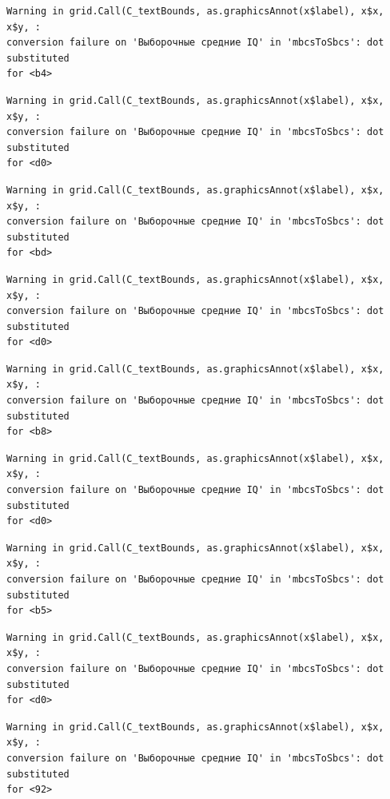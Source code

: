 \documentclass[
  letterpaper,
  DIV=11,
  numbers=noendperiod]{scrreprt}
\theoremstyle{definition}
\theoremstyle{remark}
\begin{document}
\begin{verbatim}
Warning in grid.Call(C_textBounds, as.graphicsAnnot(x$label), x$x, x$y, :
conversion failure on 'Выборочные средние IQ' in 'mbcsToSbcs': dot substituted
for <b4>
\end{verbatim}

\begin{verbatim}
Warning in grid.Call(C_textBounds, as.graphicsAnnot(x$label), x$x, x$y, :
conversion failure on 'Выборочные средние IQ' in 'mbcsToSbcs': dot substituted
for <d0>
\end{verbatim}

\begin{verbatim}
Warning in grid.Call(C_textBounds, as.graphicsAnnot(x$label), x$x, x$y, :
conversion failure on 'Выборочные средние IQ' in 'mbcsToSbcs': dot substituted
for <bd>
\end{verbatim}

\begin{verbatim}
Warning in grid.Call(C_textBounds, as.graphicsAnnot(x$label), x$x, x$y, :
conversion failure on 'Выборочные средние IQ' in 'mbcsToSbcs': dot substituted
for <d0>
\end{verbatim}

\begin{verbatim}
Warning in grid.Call(C_textBounds, as.graphicsAnnot(x$label), x$x, x$y, :
conversion failure on 'Выборочные средние IQ' in 'mbcsToSbcs': dot substituted
for <b8>
\end{verbatim}

\begin{verbatim}
Warning in grid.Call(C_textBounds, as.graphicsAnnot(x$label), x$x, x$y, :
conversion failure on 'Выборочные средние IQ' in 'mbcsToSbcs': dot substituted
for <d0>
\end{verbatim}

\begin{verbatim}
Warning in grid.Call(C_textBounds, as.graphicsAnnot(x$label), x$x, x$y, :
conversion failure on 'Выборочные средние IQ' in 'mbcsToSbcs': dot substituted
for <b5>
\end{verbatim}

\begin{verbatim}
Warning in grid.Call(C_textBounds, as.graphicsAnnot(x$label), x$x, x$y, :
conversion failure on 'Выборочные средние IQ' in 'mbcsToSbcs': dot substituted
for <d0>
\end{verbatim}

\begin{verbatim}
Warning in grid.Call(C_textBounds, as.graphicsAnnot(x$label), x$x, x$y, :
conversion failure on 'Выборочные средние IQ' in 'mbcsToSbcs': dot substituted
for <92>
\end{verbatim}
\end{document}
